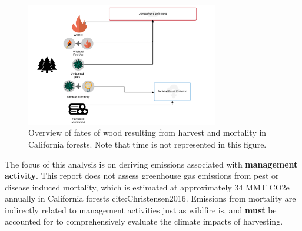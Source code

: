 \documentclass[a4paper]{article}
\begin{document}
\begin{figure}[htb]
\centering
\includegraphics[width=0.75\textwidth]{./graphics/wood_fates.pdf}
\caption{Overview of fates of wood resulting from harvest and mortality in California forests. Note that time is not represented in this figure.}
\end{figure}


The focus of this analysis is on deriving emissions associated with \textbf{management activity}. This report does not assess greenhouse gas emissions from pest or disease induced mortality, which is estimated at approximately 34 MMT CO2e annually in California forests cite:Christensen2016. Emissions from mortality are indirectly related to management activities just as wildfire is, and \textbf{must} be accounted for to comprehensively evaluate the climate impacts of harvesting.    
\end{document}

